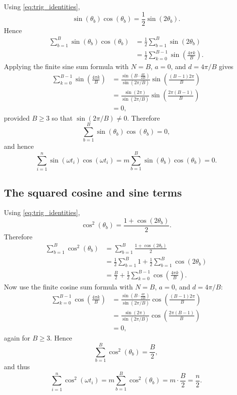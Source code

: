 \documentclass[11pt]{article}
\begin{document}
Using \eqref{eq:trig_identities},
\[
\sin(\theta_b)\cos(\theta_b)=\frac{1}{2}\sin(2\theta_b).
\]
Hence
\begin{align*}
\sum_{b=1}^B \sin(\theta_b)\cos(\theta_b)
&=
\frac{1}{2}\sum_{b=1}^B \sin(2\theta_b)\\
&=
\frac{1}{2}\sum_{k=0}^{B-1}\sin\!\left(\frac{4\pi k}{B}\right).
\end{align*}
Applying the finite sine sum formula with $N=B$, $a=0$, and $d=4\pi/B$ gives
\begin{align*}
\sum_{k=0}^{B-1}\sin\!\left(\frac{4\pi k}{B}\right)
&=
\frac{\sin\!\left(B\cdot \frac{4\pi}{2B}\right)}{\sin(2\pi/B)}
\sin\!\left(\frac{(B-1)2\pi}{B}\right)\\
&=
\frac{\sin(2\pi)}{\sin(2\pi/B)}
\sin\!\left(\frac{2\pi(B-1)}{B}\right)\\
&=
0,
\end{align*}
provided $B\ge 3$ so that $\sin(2\pi/B)\neq 0$. Therefore
\[
\sum_{b=1}^B \sin(\theta_b)\cos(\theta_b)=0,
\]
and hence
\begin{equation}
\sum_{i=1}^n \sin(\omega t_i)\cos(\omega t_i)
=
m\sum_{b=1}^B \sin(\theta_b)\cos(\theta_b)
=
0.
\label{eq:sincos_sum_subject}
\end{equation}

\subsection*{The squared cosine and sine terms}

Using \eqref{eq:trig_identities},
\[
\cos^2(\theta_b)=\frac{1+\cos(2\theta_b)}{2}.
\]
Therefore
\begin{align*}
\sum_{b=1}^B \cos^2(\theta_b)
&=
\sum_{b=1}^B \frac{1+\cos(2\theta_b)}{2}\\
&=
\frac{1}{2}\sum_{b=1}^B 1
+
\frac{1}{2}\sum_{b=1}^B \cos(2\theta_b)\\
&=
\frac{B}{2}
+
\frac{1}{2}\sum_{k=0}^{B-1}\cos\!\left(\frac{4\pi k}{B}\right).
\end{align*}
Now use the finite cosine sum formula with $N=B$, $a=0$, and $d=4\pi/B$:
\begin{align*}
\sum_{k=0}^{B-1}\cos\!\left(\frac{4\pi k}{B}\right)
&=
\frac{\sin\!\left(B\cdot \frac{4\pi}{2B}\right)}{\sin(2\pi/B)}
\cos\!\left(\frac{(B-1)2\pi}{B}\right)\\
&=
\frac{\sin(2\pi)}{\sin(2\pi/B)}
\cos\!\left(\frac{2\pi(B-1)}{B}\right)\\
&=
0,
\end{align*}
again for $B\ge 3$. Hence
\[
\sum_{b=1}^B \cos^2(\theta_b)=\frac{B}{2},
\]
and thus
\begin{equation}
\sum_{i=1}^n \cos^2(\omega t_i)
=
m\sum_{b=1}^B \cos^2(\theta_b)
=
m\cdot \frac{B}{2}
=
\frac{n}{2}.
\label{eq:cos2_sum_subject}
\end{equation}
\end{document}
